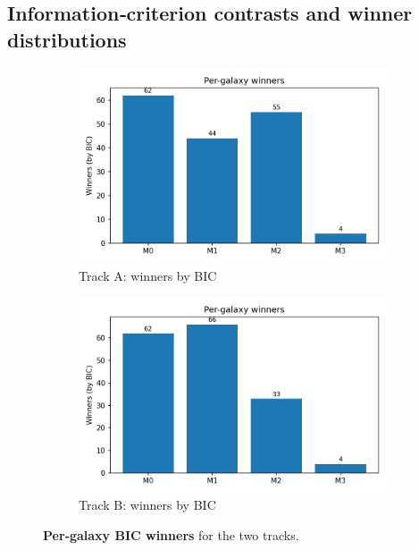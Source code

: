 \documentclass[12pt]{article}
\begin{document}
\subsection*{Information‑criterion contrasts and winner distributions}
\begin{figure}[H]
  \centering
  \begin{subfigure}{0.48\linewidth}
    \centering\includegraphics[width=\linewidth]{figs_trackA_dense/winner_counts_bar.png}
    \caption{Track A: winners by BIC}
    \label{fig:winnersA}
  \end{subfigure}\hfill
  \begin{subfigure}{0.48\linewidth}
    \centering\includegraphics[width=\linewidth]{figs_trackB_dense/winner_counts_bar.png}
    \caption{Track B: winners by BIC}
    \label{fig:winnersB}
  \end{subfigure}
  \caption{\textbf{Per‑galaxy BIC winners} for the two tracks.}
\end{figure}
\end{document}
